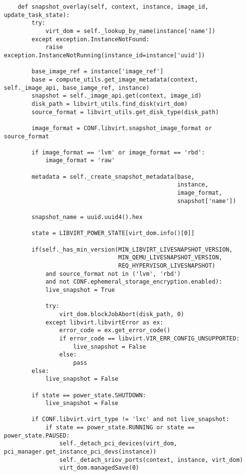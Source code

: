 \documentclass[a4paper,left=1.5cm,right=1.5cm,11pt]{article}
\begin{document}
    \begin{lstlisting}
    def snapshot_overlay(self, context, instance, image_id, update_task_state):
        try:
            virt_dom = self._lookup_by_name(instance['name'])
        except exception.InstanceNotFound:
            raise exception.InstanceNotRunning(instance_id=instance['uuid'])

        base_image_ref = instance['image_ref']
        base = compute_utils.get_image_metadata(context, self._image_api, base_iamge_ref, instance)
        snapshot = self._image_api.get(context, image_id)
        disk_path = libvirt_utils.find_disk(virt_dom)
        source_format = libvirt_utils.get_disk_type(disk_path)

        image_format = CONF.libvirt.snapshot_image_format or source_format

        if image_format == 'lvm' or image_format == 'rbd':
            image_format = 'raw'

        metadata = self._create_snapshot_metadata(base,
                                                  instance,
                                                  image_format,
                                                  snapshot['name'])

        snapshot_name = uuid.uuid4().hex

        state = LIBVIRT_POWER_STATE[virt_dom.info()[0]]

        if(self._has_min_version(MIN_LIBVIRT_LIVESNAPSHOT_VERSION,
                                 MIN_QEMU_LIVESNAPSHOT_VERSION,
                                 REQ_HYPERVISOR_LIVESNAPSHOT)
            and source_format not in ('lvm', 'rbd')
            and not CONF.ephemeral_storage_encryption.enabled):
            live_snapshot = True

            try:
                virt_dom.blockJobAbort(disk_path, 0)
            except libvirt.libvirtError as ex:
                error_code = ex.get_error_code()
                if error_code == libvirt.VIR_ERR_CONFIG_UNSUPPORTED:
                    live_snapshot = False
                else:
                    pass
        else:
            live_snapshot = False

        if state == power_state.SHUTDOWN:
            live_snapshot = False

        if CONF.libvirt.virt_type != 'lxc' and not live_snapshot:
            if state == power_state.RUNNING or state == power_state.PAUSED:
                self._detach_pci_devices(virt_dom, pci_manager.get_instance_pci_devs(instance))
                self._detach_sriov_ports(context, instance, virt_dom)
                virt_dom.managedSave(0)


\end{lstlisting}
\end{document}
